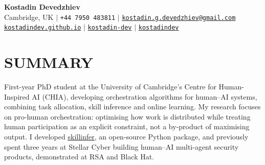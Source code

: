 \documentclass[letterpaper,11pt]{article}
\newcommand{\resumeLink}[2]{\href{#1}{\uline{#2}}}
\begin{document}
\begin{center}
    \textbf{\Huge Kostadin Devedzhiev} \\ \vspace{5pt}
    \small \faMapMarker* \hspace{2pt} Cambridge, UK \hspace{1pt} $|$ \hspace{1pt} \faPhone* \hspace{2pt} \texttt{+44 7950 483811} \hspace{1pt} $|$
    \hspace{1pt} \faEnvelope \hspace{2pt} \href{mailto:kostadin.g.devedzhiev@gmail.com}{\texttt{kostadin.g.devedzhiev@gmail.com}} \\ \vspace{1pt}
    \small \faGlobe \hspace{2pt} \href{https://kostadindev.github.io/}{\texttt{kostadindev.github.io}} \hspace{1pt} $|$
    \hspace{1pt} \faLinkedin \hspace{2pt} \href{https://www.linkedin.com/in/kostadin-dev/}{\texttt{kostadin-dev}} \hspace{1pt} $|$
    \hspace{1pt} \faGithub \hspace{2pt} \href{https://github.com/kostadindev}{\texttt{kostadindev}}
    \\ \vspace{-3pt}
\end{center}

\section{SUMMARY}
\small{First-year PhD student at the University of Cambridge's Centre for Human-Inspired AI (CHIA), developing orchestration algorithms for human--AI systems, combining task allocation, skill inference and online learning. My research focuses on pro-human orchestration: optimising how work is distributed while treating human participation as an explicit constraint, not a by-product of maximising output. I developed \resumeLink{https://kostadindev.github.io/skillinfer}{skillinfer}, an open-source Python package, and previously spent three years at Stellar Cyber building human--AI multi-agent security products, demonstrated at RSA and Black Hat.}

\end{document}
